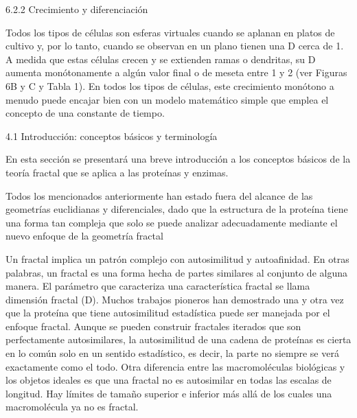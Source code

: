 \documentclass[11pt]{article}
\begin{document}
6.2.2 Crecimiento y diferenciación


Todos los tipos de células son esferas virtuales cuando se aplanan en platos de cultivo y, por lo tanto, cuando se observan en un plano tienen una D cerca de 1. A medida que estas células crecen y se extienden ramas o dendritas, su D aumenta monótonamente a algún valor final o de meseta entre 1 y 2 (ver Figuras 6B y C y Tabla 1). En todos los tipos de células, este crecimiento monótono a menudo puede encajar bien con un modelo matemático simple que emplea el concepto de una constante de tiempo.

4.1 Introducción: conceptos básicos y terminología

En esta sección se presentará una breve introducción a los conceptos básicos de la teoría fractal que se aplica a las proteínas y enzimas. 


Todos los mencionados anteriormente han estado fuera del alcance de las geometrías euclidianas y diferenciales, dado que la estructura de la proteína tiene una forma tan compleja que solo se puede analizar adecuadamente mediante el nuevo enfoque de la geometría fractal

Un fractal implica un patrón complejo con autosimilitud y autoafinidad. En otras palabras, un fractal es una forma hecha de partes similares al conjunto de alguna manera. El parámetro que caracteriza una característica fractal se llama dimensión fractal (D). Muchos trabajos pioneros han demostrado una y otra vez que la proteína que tiene autosimilitud estadística puede ser manejada por el enfoque fractal. Aunque se pueden construir fractales iterados que son perfectamente autosimilares, la autosimilitud de una cadena de proteínas es cierta en lo común solo en un sentido estadístico, es decir, la parte no siempre se verá exactamente como el todo. Otra diferencia entre las macromoléculas biológicas y los objetos ideales es que una fractal no es autosimilar en todas las escalas de longitud. Hay límites de tamaño superior e inferior más allá de los cuales una macromolécula ya no es fractal.
\end{document}
